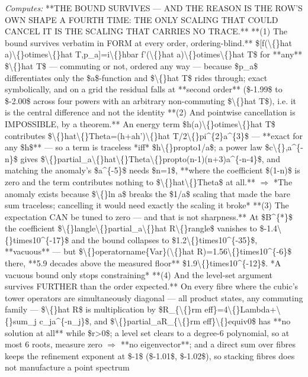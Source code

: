 \begin{description}
\emph{Computes:} **THE BOUND SURVIVES --- AND THE REASON IS THE ROW'S OWN SHAPE A FOURTH TIME: THE ONLY SCALING THAT COULD CANCEL IT IS THE SCALING THAT CARRIES NO TRACE.**  **(1) The bound survives verbatim in FORM at every order, ordering-blind.** \$[f(\textbackslash\{\}hat a)\textbackslash\{\}otimes\textbackslash\{\}hat T,p\_a]=i\textbackslash\{\}hbar f'(\textbackslash\{\}hat a)\textbackslash\{\}otimes\textbackslash\{\}hat T\$ for **any** \$\textbackslash\{\}hat T\$ --- commuting or not, ordered any way --- because \$p\_a\$ differentiates only the \$a\$-function and \$\textbackslash\{\}hat T\$ rides through; exact symbolically, and on a grid the residual falls at **second order** (\$-1.99\$ to \$-2.00\$ across four powers with an arbitrary non-commuting \$\textbackslash\{\}hat T\$), i.e. it is the central difference and not the identity  **(2) And pointwise cancellation is IMPOSSIBLE, by a theorem.** An energy term \$h(a)\textbackslash\{\}otimes\textbackslash\{\}hat T\$ contributes \$\textbackslash\{\}hat\textbackslash\{\}Theta=(h+ah')\textbackslash\{\}hat T/2\textbackslash\{\}pi\textasciicircum{}\{2\}a\textasciicircum{}\{3\}\$ --- **exact for any \$h\$** --- so a term is traceless *iff* \$h\textbackslash\{\}propto1/a\$; a power law \$c\textbackslash\{\},a\textasciicircum{}\{-n\}\$ gives \$\textbackslash\{\}partial\_a\textbackslash\{\}hat\textbackslash\{\}Theta\textbackslash\{\}propto(n-1)(n+3)a\textasciicircum{}\{-n-4\}\$, and matching the anomaly's \$a\textasciicircum{}\{-5\}\$ needs \$n=1\$, **where the coefficient \$(1-n)\$ is zero and the term contributes nothing to \$\textbackslash\{\}hat\textbackslash\{\}Theta\$ at all.** \ensuremath{\Rightarrow}  *The anomaly exists because \$\textbackslash\{\}ln a\$ breaks the \$1/a\$ scaling that made the bare sum traceless; cancelling it would need exactly the scaling it broke*  **(3) The expectation CAN be tuned to zero --- and that is not sharpness.** At \$B\textasciicircum{}\{*\}\$ the coefficient \$\textbackslash\{\}langle\textbackslash\{\}partial\_a\textbackslash\{\}hat R\textbackslash\{\}rangle\$ vanishes to \$-1.4\textbackslash\{\}times10\textasciicircum{}\{-17\}\$ and the bound collapses to \$1.2\textbackslash\{\}times10\textasciicircum{}\{-35\}\$, **vacuous** --- but \$\textbackslash\{\}operatorname\{Var\}(\textbackslash\{\}hat R)=1.56\textbackslash\{\}times10\textasciicircum{}\{-6\}\$ there, **5.9 decades above the measured floor** \$1.9\textbackslash\{\}times10\textasciicircum{}\{-12\}\$. *A vacuous bound only stops constraining*  **(4) And the level-set argument survives FURTHER than the order expected.** On every fibre where the cubic's tower operators are simultaneously diagonal --- all product states, any commuting family --- \$\textbackslash\{\}hat R\$ is multiplication by \$R\_\{\textbackslash\{\}rm eff\}=4\textbackslash\{\}Lambda+\textbackslash\{\}sum\_j c\_ja\textasciicircum{}\{-n\_j\}\$, and \$\textbackslash\{\}partial\_aR\_\{\textbackslash\{\}rm eff\}\textbackslash\{\}equiv0\$ has **no solution at all** while \$r>0\$; a level set clears to a degree-6 polynomial, so at most 6 roots, measure zero \ensuremath{\Rightarrow} **no eigenvector**; and a direct sum over fibres keeps the refinement exponent at \$-1\$ (\$-1.01\$, \$-1.02\$), so stacking fibres does not manufacture a point spectrum  
\end{description}
